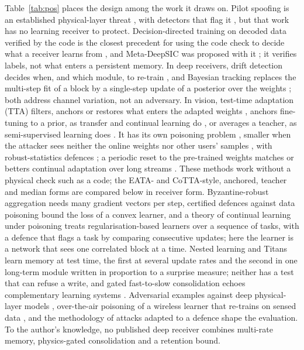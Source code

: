 \documentclass[journal]{IEEEtran}
\theoremstyle{remark}
\begin{document}
Table~\ref{tab:pos} places the design among the work it draws on. Pilot spoofing is an
established physical-layer threat \cite{zhou2012pilot,kapetanovic2015}, with detectors that
flag it \cite{kapetanovic2013,tugnait2015}, but that work has no learning receiver to protect. Decision-directed
training on decoded data verified by the code is the closest precedent for using the code check
to decide what a receiver learns from \cite{viterbinet2020,schibisch2018}, and Meta-DeepSIC was proposed with it \cite{raviv2023}; it verifies labels, not what enters a
persistent memory. In deep receivers, drift detection decides when, and which module, to re-train \cite{uzlaner2024}, and Bayesian tracking replaces the multi-step fit of a block by a single-step update of a posterior over the weights \cite{gusakov2025}; both address channel variation, not an adversary. In vision, test-time adaptation (TTA) filters, anchors or restores what enters the
adapted weights \cite{eata2022,cotta2022,sar2023,rotta2023,persistent2024}, anchors fine-tuning to a
prior, as transfer and continual learning do \cite{l2sp2018,ewc2017}, or averages a teacher, as semi-supervised learning does \cite{meanteacher2017}. It has its own
poisoning problem \cite{wu2023tta,cong2024}, smaller when the attacker sees neither the online weights nor other users' samples \cite{su2025}, with robust-statistics defences \cite{medbn}; a periodic reset to the pre-trained weights matches or betters continual adaptation over long streams \cite{rdumb2023}. These methods
work without a physical check such as a code; the EATA- and CoTTA-style, anchored, teacher and median forms are compared below in receiver form. Byzantine-robust aggregation
\cite{blanchard2017} needs many gradient vectors per step, certified defences against data
poisoning \cite{steinhardt2017} bound the loss of a convex learner, and a theory of continual learning under poisoning \cite{hu2026} treats regularisation-based learners over a sequence of tasks, with a defence that flags a task by comparing consecutive updates; here the learner is a network
that sees one correlated block at a time. Nested learning \cite{behrouz2025nested} and Titans
\cite{behrouz2025titans} learn memory at test time, the first at several update rates and the second in one
long-term module written in proportion to a surprise measure; neither has a test that can refuse a write, and gated fast-to-slow consolidation echoes complementary learning systems
\cite{mcclelland1995,kumaran2016}. Adversarial examples against deep physical-layer models
\cite{sadeghi2019,sadeghi2019ae}, over-the-air poisoning of a wireless learner that re-trains on sensed data \cite{sagduyu2021}, and the methodology of attacks adapted to a defence
\cite{athalye2018obfuscated,carlini2019,tramer2020} shape the evaluation. To the author's knowledge, no published deep receiver combines multi-rate memory, physics-gated consolidation and a retention bound.
\end{document}
